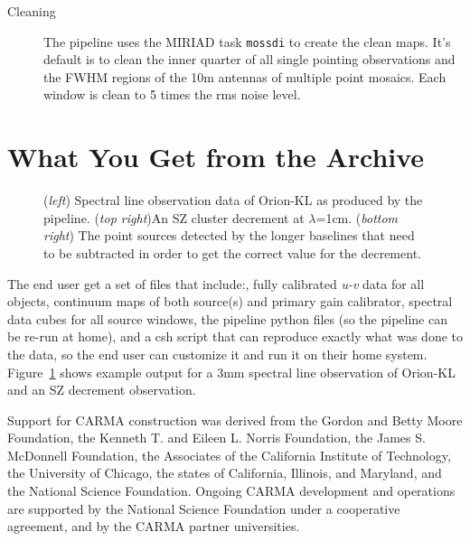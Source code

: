 \begin{description}
\begin{description}
\item[Cleaning] The pipeline uses the MIRIAD task \verb#mossdi# to create the clean maps. It's default is to clean the inner quarter of all single pointing observations and the FWHM regions of the 10m antennas of multiple point mosaics. Each window is clean to 5 times the rms noise level.
\end{description}
\end{description}

\section{What You Get from the Archive}
\begin{figure}[!ht]
\end{figure}
\begin{figure}[!ht]
\caption{(\textit{left}) Spectral line observation data of Orion-KL as produced by the pipeline. (\textit{top right})An SZ cluster decrement at $\lambda$=1cm. (\textit{bottom right}) The point sources detected by the longer baselines that need to be subtracted in order to get the correct value for the decrement.\label{fig:SZD}}
\end{figure}
\begin{figure}[!ht]
\end{figure}
The end user get a set of files that include:, fully calibrated \textit{u-v} data for all objects, continuum maps of both source(s) and primary gain calibrator, spectral data cubes for all source windows, the pipeline python files (so the pipeline can be re-run at home), and a csh script that can reproduce exactly what was done to the data, so the end user can customize it and run it on their home system. Figure~\ref{fig:SZD} shows example output for a 3mm spectral line observation of Orion-KL and an SZ decrement observation.

\acknowledgements Support for CARMA construction was derived from the Gordon and Betty Moore Foundation, the Kenneth T. and Eileen L. Norris Foundation, the James S. McDonnell Foundation, the Associates of the California Institute of Technology, the University of Chicago, the states of California, Illinois, and Maryland, and the National Science Foundation. Ongoing CARMA development and operations are supported by the National Science Foundation under a cooperative agreement, and by the CARMA partner universities.



